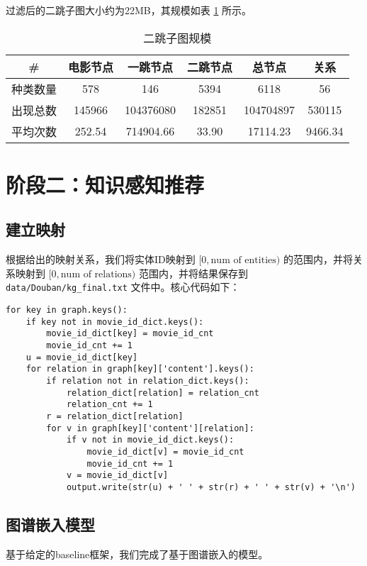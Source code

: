 \documentclass{ctexart}
\begin{document}
\begin{sloppypar}
    过滤后的二跳子图大小约为22MB，其规模如表 \ref{tab:1} 所示。

    \begin{table}[h]
        \centering
        \caption{二跳子图规模\label{tab:1}}
        \begin{tabular}{cccccc}
            \toprule
            \#       & 电影节点 & 一跳节点  & 二跳节点 & 总节点    & 关系    \\ \midrule
            种类数量 & 578      & 146       & 5394     & 6118      & 56      \\
            出现总数 & 145966   & 104376080 & 182851   & 104704897 & 530115  \\
            平均次数 & 252.54   & 714904.66 & 33.90    & 17114.23  & 9466.34 \\
            \bottomrule
        \end{tabular}
    \end{table}

    \section{阶段二：知识感知推荐}

    \subsection{建立映射}
    根据给出的映射关系，我们将实体ID映射到 $[0, \text{num of entities})$ 的范围内，并将关系映射到 $[0, \text{num of relations})$ 范围内，并将结果保存到 \texttt{data/Douban/kg\_final.txt} 文件中。核心代码如下：
    \begin{lstlisting}[style=python]
for key in graph.keys():
    if key not in movie_id_dict.keys():
        movie_id_dict[key] = movie_id_cnt
        movie_id_cnt += 1
    u = movie_id_dict[key]
    for relation in graph[key]['content'].keys():
        if relation not in relation_dict.keys():
            relation_dict[relation] = relation_cnt
            relation_cnt += 1
        r = relation_dict[relation]
        for v in graph[key]['content'][relation]:
            if v not in movie_id_dict.keys():
                movie_id_dict[v] = movie_id_cnt
                movie_id_cnt += 1
            v = movie_id_dict[v]
            output.write(str(u) + ' ' + str(r) + ' ' + str(v) + '\n')
\end{lstlisting}

    \subsection{图谱嵌入模型}
    基于给定的baseline框架，我们完成了基于图谱嵌入的模型。


\end{sloppypar}
\end{document}
